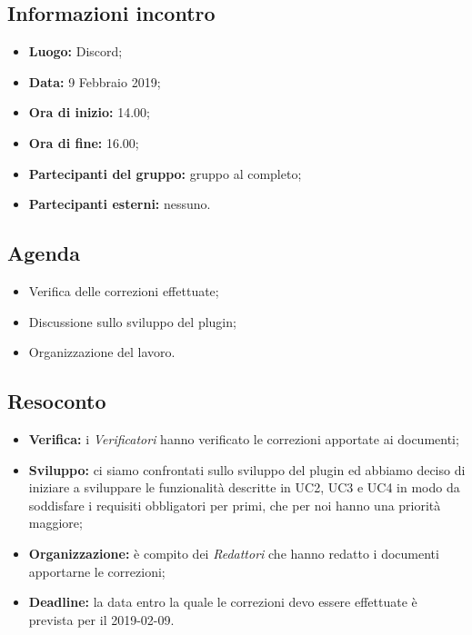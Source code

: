 \subsection{Informazioni incontro}
\begin{itemize}
	\item { \textbf{Luogo:} Discord};
	\item { \textbf{Data:} 9 Febbraio 2019};
	\item { \textbf{Ora di inizio:} 14.00};
	\item { \textbf{Ora di fine:} 16.00};
	\item { \textbf{Partecipanti del gruppo:} gruppo al completo};
	\item { \textbf{Partecipanti esterni:} nessuno}.
\end{itemize}


\subsection{Agenda}
\begin{itemize}
	\item {Verifica delle correzioni effettuate;}
	\item {Discussione sullo sviluppo del plugin;}
	\item {Organizzazione del lavoro.}
\end{itemize}

\subsection{Resoconto}
\begin{itemize}
	\item { \textbf{Verifica:} i \emph{Verificatori} hanno verificato le correzioni apportate ai documenti;}
	\item { \textbf{Sviluppo:} ci siamo confrontati sullo sviluppo del plugin ed abbiamo deciso di iniziare a sviluppare le funzionalità descritte in UC2, UC3 e UC4 in modo da soddisfare i requisiti obbligatori per primi, che per noi hanno una priorità maggiore;}
	\item { \textbf{Organizzazione:} è compito dei \emph{Redattori} che hanno redatto i documenti apportarne le correzioni;}	
	\item { \textbf{Deadline:} la data entro la quale le correzioni devo essere effettuate è prevista per il 2019-02-09.}
\end{itemize}

